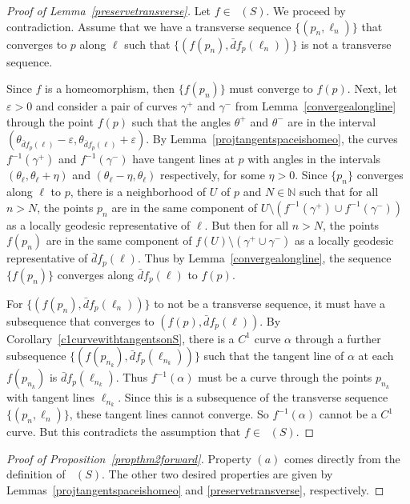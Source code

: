 \documentclass[sn-mathphys-num]{sn-jnl}%
\theoremstyle{thmstyleone}%
\theoremstyle{thmstyletwo}%
\theoremstyle{thmstylethree}%
\DeclareMathOperator{\thomeo}{Homeo^{1}}
\begin{document}
\begin{proof}[Proof of Lemma~\ref{preservetransverse}]
Let $f \in \thomeo(S)$.  We proceed by contradiction.  Assume that we have a transverse sequence $\{(p_n, \ell_n)\}$ that converges to $p$ along $\ell$ such that $\{(f(p_n), \bar{d}f_p(\ell_n))\}$ is not a transverse sequence.  

Since $f$ is a homeomorphism, then $\{f(p_n)\}$ must converge to $f(p)$.  Next, let $\varepsilon >0$ and consider a pair of curves $\gamma^+$ and $\gamma^-$ from Lemma~\ref{convergealongline} through the point $f(p)$ such that the angles $\theta^+$ and $\theta^-$ are in the interval $(\theta_{\bar{d}f_p(\ell)} - \varepsilon,  \theta_{\bar{d}f_p(\ell)} + \varepsilon)$.   By Lemma~\ref{projtangentspaceishomeo}, the curves $f^{-1}(\gamma^+)$ and $f^{-1}(\gamma^-)$ have tangent lines at $p$ with angles in the intervals $(\theta_{\ell},  \theta_{\ell} + \eta)$ and $(\theta_{\ell} -\eta, \theta_{\ell})$ respectively, for some $\eta >0$.   Since $\{p_n\}$ converges along $\ell$ to $p$,  there is a neighborhood of $U$ of $p$ and $N \in \mathbb{N}$ such that for all $n >N$, the points $p_n$ are in the same component of $U \setminus (f^{-1}(\gamma^+) \cup f^{-1}(\gamma^-))$ as a locally geodesic representative of $\ell$.  But then for all $n >N$,  the points $f(p_n)$ are in the same component of $f(U) \setminus (\gamma^+ \cup \gamma^-)$ as a locally geodesic representative of $\bar{d}f_p(\ell)$.  Thus by Lemma~\ref{convergealongline},  the sequence $\{f(p_n)\}$ converges along $\bar{d}f_p(\ell)$ to $f(p)$. 

For $\{(f(p_n), \bar{d}f_p(\ell_n))\}$ to not be a transverse sequence,  it must have a subsequence that converges to $(f(p), \bar{d}f_p(\ell))$.  By Corollary~\ref{c1curvewithtangentsonS}, there is a $C^1$ curve $\alpha$ through a further subsequence $\{(f(p_{n_{k}}), \bar{d}f_p(\ell_{n_{k}}))\}$ such that the tangent line of $\alpha$ at each $f(p_{n_{k}})$ is $\bar{d}f_p(\ell_{n_{k}})$.  Thus $f^{-1}(\alpha)$ must be a curve through the points $p_{n_{k}}$ with tangent lines $\ell_{n_{k}}$.  Since this is a subsequence of the transverse sequence $\{(p_n, \ell_n)\}$,  these tangent lines cannot converge.  So $f^{-1}(\alpha)$ cannot be a $C^1$ curve.  But this contradicts the assumption that $f \in \thomeo(S)$.  
\end{proof}


\begin{proof}[Proof of Proposition~\ref{propthm2forward}]
Property $(a)$ comes directly from the definition of $\thomeo(S)$.  The other two desired properties are given by Lemmas~\ref{projtangentspaceishomeo} and \ref{preservetransverse}, respectively.
\end{proof}
\end{document}
